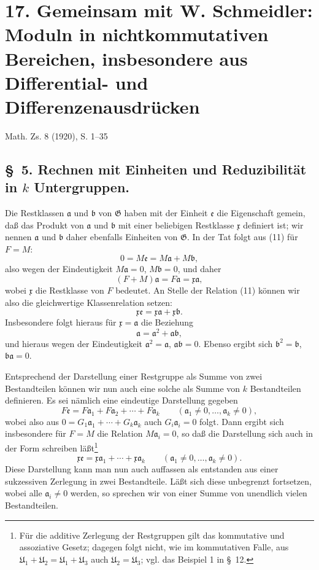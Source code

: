 \documentclass[11pt]{article}
\newcommand{\mG}{\mathfrak{G}}
\newcommand{\ma}{\mathfrak{a}}
\newcommand{\mb}{\mathfrak{b}}
\newcommand{\mx}{\mathfrak{x}}
\newcommand{\me}{\mathfrak{e}}
\newcommand{\mU}{\mathfrak{U}}
\begin{document}
\clearpage
\setcounter{footnote}{0}
\section*{17. Gemeinsam mit W. Schmeidler: Moduln in nichtkommutativen Bereichen, insbesondere aus Differential- und Differenzenausdrücken}
\begin{center}
Math. Zs. 8 (1920), S. 1--35
\end{center}

\subsection*{\S~5. Rechnen mit Einheiten und Reduzibilität in $k$ Untergruppen.}

Die Restklassen $\ma$ und $\mb$ von $\mG$ haben mit der Einheit $\me$ die Eigenschaft gemein, daß das Produkt von $\ma$ und $\mb$ mit einer beliebigen Restklasse $\mx$ definiert ist; wir nennen $\ma$ und $\mb$ daher ebenfalls Einheiten von $\mG$. In der Tat folgt aus (11) für $F=M$:
\[
 0=M\me=M\ma+M\mb,
\]
also wegen der Eindeutigkeit $M\ma=0$, $M\mb=0$, und daher
\[
 (F+M)\ma=F\ma=\mx\ma,
\]
wobei $\mx$ die Restklasse von $F$ bedeutet. An Stelle der Relation (11) können wir also die gleichwertige Klassenrelation setzen:
\[
 \mx\me=\mx\ma+\mx\mb.
\]
Insbesondere folgt hieraus für $\mx=\ma$ die Beziehung
\[
 \ma=\ma^2+\ma\mb,
\]
und hieraus wegen der Eindeutigkeit $\ma^2=\ma$, $\ma\mb=0$. Ebenso ergibt sich $\mb^2=\mb$, $\mb\ma=0$.

Entsprechend der Darstellung einer Restgruppe als Summe von zwei Bestandteilen können wir nun auch eine solche als Summe von $k$ Bestandteilen definieren. Es sei nämlich eine eindeutige Darstellung gegeben
\[
 F\me=F\ma_1+F\ma_2+\cdots+F\ma_k\qquad(\ma_1\ne0,\ldots,\ma_k\ne0),
\]
wobei also aus $0=G_1\ma_1+\cdots+G_k\ma_k$ auch $G_i\ma_i=0$ folgt. Dann ergibt sich insbesondere für $F=M$ die Relation $M\ma_i=0$, so daß die Darstellung sich auch in der Form schreiben läßt\footnote{Für die additive Zerlegung der Restgruppen gilt das kommutative und assoziative Gesetz; dagegen folgt nicht, wie im kommutativen Falle, aus $\mU_1+\mU_2=\mU_1+\mU_3$ auch $\mU_2=\mU_3$; vgl. das Beispiel 1 in \S~12.}
\begin{equation}
 \mx\me=\mx\ma_1+\cdots+\mx\ma_k\qquad(\ma_1\ne0,\ldots,\ma_k\ne0).
\tag{12}
\end{equation}
Diese Darstellung kann man nun auch auffassen als entstanden aus einer sukzessiven Zerlegung in zwei Bestandteile. Läßt sich diese unbegrenzt fortsetzen, wobei alle $\ma_i\ne0$ werden, so sprechen wir von einer Summe von unendlich vielen Bestandteilen.
\end{document}
